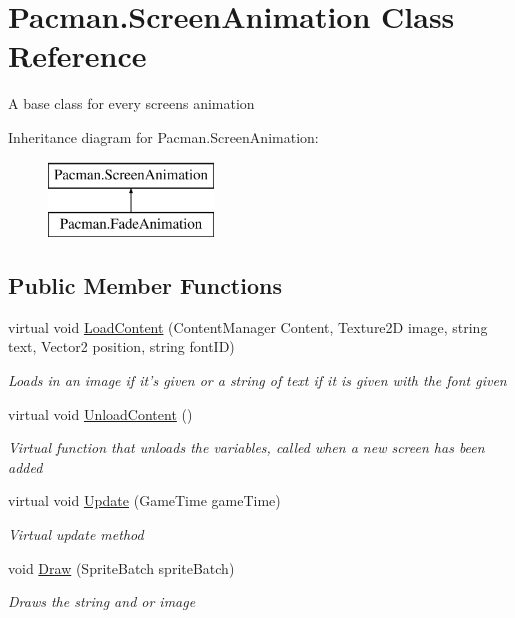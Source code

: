 \hypertarget{class_pacman_1_1_screen_animation}{\section{Pacman.\-Screen\-Animation Class Reference}
\label{class_pacman_1_1_screen_animation}
}


A base class for every screens animation  


Inheritance diagram for Pacman.\-Screen\-Animation\-:\begin{figure}[H]
\begin{center}
\leavevmode
\includegraphics[height=2.000000cm]{class_pacman_1_1_screen_animation}
\end{center}
\end{figure}
\subsection*{Public Member Functions}
\begin{DoxyCompactItemize}
\item 
virtual void \hyperlink{class_pacman_1_1_screen_animation_a566ecb3dca9f82c4eb51f4e3a4019550}{Load\-Content} (Content\-Manager Content, Texture2\-D image, string text, Vector2 position, string font\-I\-D)
\begin{DoxyCompactList}\small\item\em Loads in an image if it's given or a string of text if it is given with the font given \end{DoxyCompactList}\item 
virtual void \hyperlink{class_pacman_1_1_screen_animation_ad9bf49699b6905423cc17047e36e9a1c}{Unload\-Content} ()
\begin{DoxyCompactList}\small\item\em Virtual function that unloads the variables, called when a new screen has been added \end{DoxyCompactList}\item 
virtual void \hyperlink{class_pacman_1_1_screen_animation_af381913622005dfb6b759f7495b37ded}{Update} (Game\-Time game\-Time)
\begin{DoxyCompactList}\small\item\em Virtual update method \end{DoxyCompactList}\item 
void \hyperlink{class_pacman_1_1_screen_animation_aab67af6395aea7e03c7d4d4f6eff9977}{Draw} (Sprite\-Batch sprite\-Batch)
\begin{DoxyCompactList}\small\item\em Draws the string and or image \end{DoxyCompactList}\end{DoxyCompactItemize}
